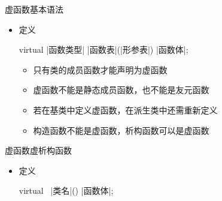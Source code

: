 \begin{frame}[t, fragile]{虚函数}{基本语法}%
  \begin{spacing}{1.8}
  \begin{itemize}
  \item 定义\\
    \begin{center}
      \begin{minipage}[t]{0.5\linewidth}
        \begin{cppttnobg}
virtual |函数类型| |函数表|(|形参表|)
{
  |函数体|;
}
        \end{cppttnobg}
      \end{minipage}
    \end{center}        
    \begin{itemize}
    \item 只有类的成员函数才能声明为虚函数
    \item 虚函数不能是静态成员函数，也不能是友元函数
    \item 若在基类中定义虚函数，在派生类中还需重新定义
    \item 构造函数不能是虚函数，析构函数可以是虚函数
    \end{itemize}    
  \end{itemize}
  \end{spacing}
\end{frame}

\begin{frame}[t, fragile]{虚函数}{虚析构函数}%
  \begin{itemize}
  \item 定义\\    
      \begin{center}
      \begin{minipage}[t]{0.5\linewidth}
        \begin{cppttnobg}
virtual ~|类名|()
{
  |函数体|;
}
        \end{cppttnobg}
      \end{minipage}
    \end{center}
  \end{itemize}
\end{frame}

